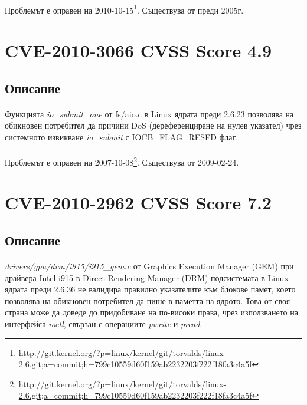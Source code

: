 \documentclass[a4paper,12pt,leqno]{article}
\begin{document}
\paragraph{}
Проблемът е оправен на 2010-10-15\footnote{\url{http://git.kernel.org/?p=linux/kernel/git/torvalds/linux-2.6.git;a=commit;h=799c10559d60f159ab2232203f222f18fa3c4a5f}}.
Съществува от преди 2005г.

\section{CVE-2010-3066 CVSS Score 4.9}
\subsection{Описание}
\paragraph{}
Функцията \textit{io\_submit\_one} от fs/aio.c в Linux ядрата преди 2.6.23 позволява на обикновен потребител да причини DoS (дереференциране на нулев указател) чрез системното извикване \textit{io\_submit} с IOCB\_FLAG\_RESFD флаг.
\paragraph{}
Проблемът е оправен на 2007-10-08\footnote{\url{http://git.kernel.org/?p=linux/kernel/git/torvalds/linux-2.6.git;a=commit;h=799c10559d60f159ab2232203f222f18fa3c4a5f}}.
Съществува от 2009-02-24.

\section{CVE-2010-2962 CVSS Score 7.2}
\subsection{Описание}
\paragraph{}
\textit{drivers/gpu/drm/i915/i915\_gem.c} от Graphics Execution Manager (GEM) при драйвера Intel i915 в Direct Rendering Manager (DRM) подсистемата в Linux ядрата преди 2.6.36 не валидира правилно указателите към блокове памет, което позволява на обикновен потребител да пише в паметта на ядрото. Това от своя страна може да доведе до придобиване на по-високи права, чрез използването на интерфейса \textit{ioctl}, свързан с операциите \textit{pwrite} и \textit{pread}.
\end{document}
